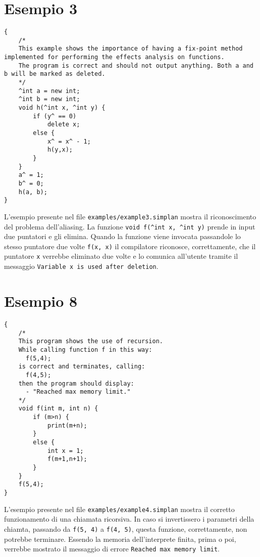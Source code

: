 \documentclass[../report.tex]{subfiles}
\begin{document}
\section{Esempio 3}
\begin{lstlisting}
{
    /*
    This example shows the importance of having a fix-point method implemented for performing the effects analysis on functions.
    The program is correct and should not output anything. Both a and b will be marked as deleted.
    */
    ^int a = new int;
    ^int b = new int;
    void h(^int x, ^int y) {
        if (y^ == 0)
            delete x;
        else {
            x^ = x^ - 1;
            h(y,x);
        }
    }
    a^ = 1;
    b^ = 0;
    h(a, b);
}
\end{lstlisting}
L'esempio presente nel file \verb|examples/example3.simplan| mostra il riconoscimento del problema dell'aliasing. La funzione \verb|void f(^int x, ^int y)| prende in input due puntatori e gli elimina. Quando la funzione viene invocata passandole lo stesso puntatore due volte \verb|f(x, x)| il compilatore riconosce, correttamente, che il puntatore \verb|x| verrebbe eliminato due volte e lo comunica all'utente tramite il messaggio \verb|Variable x is used after deletion|.

\section{Esempio 8}
\begin{lstlisting}
{
    /*
    This program shows the use of recursion.
    While calling function f in this way:
      f(5,4);
    is correct and terminates, calling:
      f(4,5);
    then the program should display:
      - "Reached max memory limit."
    */
    void f(int m, int n) {
        if (m>n) {
            print(m+n);
        }
        else {
            int x = 1;
            f(m+1,n+1);
        }
    }
    f(5,4);
}
\end{lstlisting}
L'esempio presente nel file \verb|examples/example4.simplan| mostra il corretto funzionamento di una chiamata ricorsiva. In caso si invertissero i parametri della chiamta, passando da \verb|f(5, 4)| a \verb|f(4, 5)|, questa funzione, correttamente, non potrebbe terminare. Essendo la memoria dell'interprete finita, prima o poi, verrebbe mostrato il messaggio di errore \verb|Reached max memory limit|.
\end{document}
